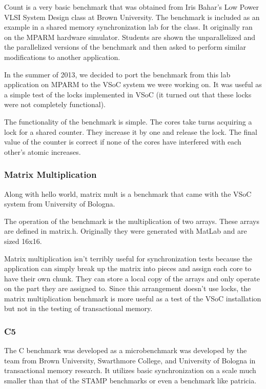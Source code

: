 \documentclass{article}
\begin{document}
Count is a very basic benchmark that was obtained from Iris Bahar's Low Power 
VLSI System Design class at Brown University. The benchmark is included as an 
example in a shared memory synchronization lab for the class. It originally 
ran on the MPARM hardware simulator. Students are shown the unparallelized and 
the parallelized versions of the benchmark and then asked to perform similar 
modifications to another application. 

In the summer of 2013, we decided to port the benchmark from this lab 
application on MPARM to the VSoC system we were working on.  It was useful as 
a simple test of the locks implemented in VSoC (it turned out that these locks 
were not completely functional).

The functionality of the benchmark is simple. The cores take turns acquiring a 
lock for a shared counter. They increase it by one and release the lock. The 
final value of the counter is correct if none of the cores have interfered 
with each other's atomic increases.

\subsubsection{Matrix Multiplication}

Along with hello world, matrix mult is a benchmark that came with the VSoC 
system from University of Bologna. 

The operation of the benchmark is the multiplication of two arrays. These 
arrays are defined in matrix.h. Originally they were generated with MatLab and 
are sized 16x16. 

Matrix multiplication isn't terribly useful for synchronization tests because 
the application can simply break up the matrix into pieces and assign each 
core to have their own chunk.  They can store a local copy of the arrays and 
only operate on the part they are assigned to. Since this arrangement doesn't 
use locks, the matrix multiplication benchmark is more useful as a test of the 
VSoC installation but not in the testing of transactional memory. 

\subsubsection{C5}

The C benchmark was developed as a microbenchmark was developed by the team
from Brown University, Swarthmore College, and University of Bologna in 
transactional memory research. It utilizes basic synchronization on a scale 
much smaller than that of the STAMP benchmarks or even a benchmark like 
patricia.
\end{document}
